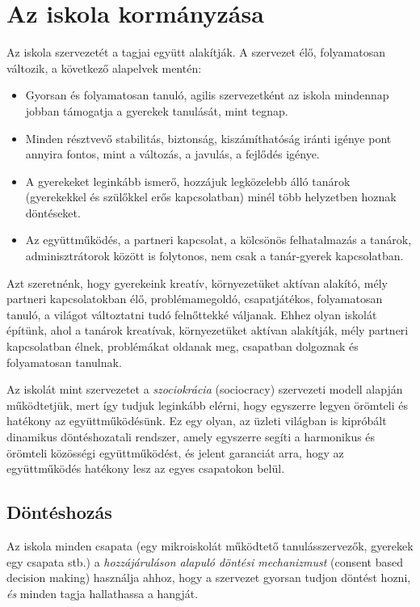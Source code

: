 \section{Az iskola kormányzása}
\label{sec:az_iskola_kormanyzasa}
Az iskola szervezetét a tagjai együtt alakítják. A szervezet élő, folyamatosan változik, a következő alapelvek mentén:

\begin{itemize}

  \item
        Gyorsan és folyamatosan tanuló, agilis szervezetként az iskola minden\-nap jobban támogatja a gyerekek tanulását, mint tegnap.
  \item
        Minden résztvevő stabilitás, biztonság, kiszámíthatóság iránti igénye pont annyira fontos, mint a változás, a javulás, a fejlődés igénye.
  \item
        A gyerekeket leginkább ismerő, hozzájuk legközelebb álló tanárok (gyerekekkel és szülőkkel erős kapcsolatban) minél több helyzetben hoznak döntéseket.
  \item
        Az együttműködés, a partneri kapcsolat, a kölcsönös felhatalmazás a tanárok, adminisztrátorok között is folytonos, nem csak a tanár-gyerek kapcsolatban.
\end{itemize}

Azt szeretnénk, hogy gyerekeink kreatív, környezetüket aktívan alakító, mély partneri kapcsolatokban élő, problémamegoldó, csapatjátékos, folyamatosan tanuló, a világot változtatni tudó felnőttekké váljanak. Ehhez olyan iskolát építünk, ahol a tanárok kreatívak, környezetüket aktívan alakítják, mély partneri kapcsolatban élnek, problémákat oldanak meg, csapatban dolgoznak és folyamatosan tanulnak.

Az iskolát mint szervezetet a \emph{szociokrácia} (sociocracy) szervezeti modell alapján működtetjük, mert így tudjuk leginkább elérni, hogy egyszerre legyen örömteli és hatékony az együttműködésünk. Ez egy olyan, az üzleti világban is kipróbált dinamikus döntéshozatali rendszer, amely egyszerre segíti a harmonikus és örömteli közösségi együttműködést, és jelent garanciát arra, hogy az együttműködés hatékony lesz az egyes csapatokon belül.

\subsection{Döntéshozás}
\label{sec:consent_based}

Az iskola minden csapata (egy mikroiskolát működtető tanulásszervezők, gyerekek egy csapata stb.) a \emph{hozzájáruláson alapuló döntési mechanizmust} (consent based decision making) használja ahhoz, hogy a szervezet gyorsan tudjon döntést hozni, \emph{és} minden tagja hallathassa a hangját.

